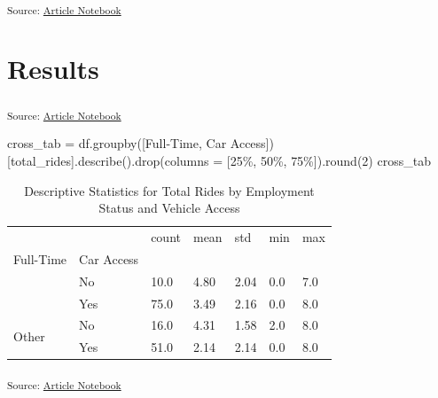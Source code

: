 \documentclass[
  letterpaper,
  DIV=11,
  numbers=noendperiod]{scrartcl}
\newenvironment{Shaded}{\begin{snugshade}}{\end{snugshade}}
\newcommand{\BuiltInTok}[1]{\textcolor[rgb]{0.00,0.23,0.31}{#1}}
\newcommand{\DecValTok}[1]{\textcolor[rgb]{0.68,0.00,0.00}{#1}}
\newcommand{\NormalTok}[1]{\textcolor[rgb]{0.00,0.23,0.31}{#1}}
\newcommand{\OperatorTok}[1]{\textcolor[rgb]{0.37,0.37,0.37}{#1}}
\newcommand{\StringTok}[1]{\textcolor[rgb]{0.13,0.47,0.30}{#1}}
\begin{document}
\textsubscript{Source:
\href{https://RachelRapier.github.io/psych_755_project/index.qmd.html}{Article
Notebook}}

\section{Results}\label{results}

\textsubscript{Source:
\href{https://RachelRapier.github.io/psych_755_project/index.qmd.html}{Article
Notebook}}

\begin{Shaded}
\begin{Highlighting}[]
\NormalTok{cross\_tab }\OperatorTok{=}\NormalTok{ df.groupby([}\StringTok{\textquotesingle{}Full{-}Time\textquotesingle{}}\NormalTok{, }\StringTok{\textquotesingle{}Car Access\textquotesingle{}}\NormalTok{])[}\StringTok{\textquotesingle{}total\_rides\textquotesingle{}}\NormalTok{].describe().drop(columns }\OperatorTok{=}\NormalTok{ [}\StringTok{\textquotesingle{}25\%\textquotesingle{}}\NormalTok{, }\StringTok{\textquotesingle{}50\%\textquotesingle{}}\NormalTok{, }\StringTok{\textquotesingle{}75\%\textquotesingle{}}\NormalTok{]).}\BuiltInTok{round}\NormalTok{(}\DecValTok{2}\NormalTok{)}
\NormalTok{cross\_tab}
\end{Highlighting}
\end{Shaded}

{

\begin{longtable}[]{@{}lllllll@{}}

\caption{\label{tbl-groupby}Descriptive Statistics for Total Rides by
Employment Status and Vehicle Access}

\tabularnewline

\toprule\noalign{}
& & count & mean & std & min & max \\
Full-Time & Car Access & & & & & \\
\midrule\noalign{}
\endhead
\bottomrule\noalign{}
\endlastfoot
\multirow{2}{*}{Full-Time} & No & 10.0 & 4.80 & 2.04 & 0.0 & 7.0 \\
& Yes & 75.0 & 3.49 & 2.16 & 0.0 & 8.0 \\
\multirow{2}{*}{Other} & No & 16.0 & 4.31 & 1.58 & 2.0 & 8.0 \\
& Yes & 51.0 & 2.14 & 2.14 & 0.0 & 8.0 \\

\end{longtable}

}

\textsubscript{Source:
\href{https://RachelRapier.github.io/psych_755_project/index.qmd.html}{Article
Notebook}}
\end{document}

